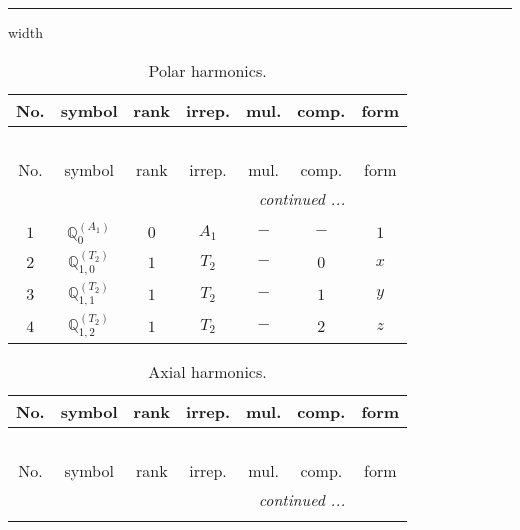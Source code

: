 \documentclass[fleqn,10pt,landscape]{article}
\begin{document}
\begin{itemize}
 \hfil \hrule height 1mm width \textwidth \hfil

\begin{center}
\renewcommand{\arraystretch}{1.3}
\begin{longtable}{ccccccc}
\caption{Polar harmonics.}
 \\
 \hline \hline
No. & symbol & rank & irrep. & mul. & comp. & form \\ \hline \endfirsthead

\multicolumn{6}{l}{\tablename\ \thetable{}} \\
 \hline \hline
No. & symbol & rank & irrep. & mul. & comp. & form \\ \hline \endhead

 \hline \hline
\multicolumn{6}{r}{\footnotesize\it continued ...} \\ \endfoot

 \hline \hline
\multicolumn{6}{r}{} \\ \endlastfoot

$ 1 $ & $ \mathbb{Q}_{0}^{(A_{1})} $ & $ 0 $ & $ A_{1} $ & $ - $ & $ - $ & $ 1 $ \\ \hline
$ 2 $ & $ \mathbb{Q}_{1,0}^{(T_{2})} $ & $ 1 $ & $ T_{2} $ & $ - $ & $ 0 $ & $ x $ \\
$ 3 $ & $ \mathbb{Q}_{1,1}^{(T_{2})} $ & $ 1 $ & $ T_{2} $ & $ - $ & $ 1 $ & $ y $ \\
$ 4 $ & $ \mathbb{Q}_{1,2}^{(T_{2})} $ & $ 1 $ & $ T_{2} $ & $ - $ & $ 2 $ & $ z $ \\
\end{longtable}
\end{center}
\begin{center}
\renewcommand{\arraystretch}{1.3}
\begin{longtable}{ccccccc}
\caption{Axial harmonics.}
 \\
 \hline \hline
No. & symbol & rank & irrep. & mul. & comp. & form \\ \hline \endfirsthead

\multicolumn{6}{l}{\tablename\ \thetable{}} \\
 \hline \hline
No. & symbol & rank & irrep. & mul. & comp. & form \\ \hline \endhead

 \hline \hline
\multicolumn{6}{r}{\footnotesize\it continued ...} \\ \endfoot


\end{longtable}
\end{center}
\end{itemize}
\end{document}

